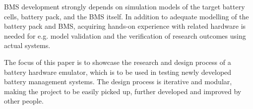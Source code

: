 BMS development strongly depends on simulation models of the target
battery cells, battery pack, and the BMS itself. In addition to adequate modelling 
of the battery pack and BMS, acquiring hands-on experience with related
hardware is needed for e.g. model validation and the verification of 
research outcomes using actual systems.

The focus of this paper is to showcase the research and design process of 
a battery hardware emulator, which is to be used in testing newly developed 
battery management systems. The design process is iterative and modular, 
making the project to be easily picked up, further developed and improved 
by other people.  